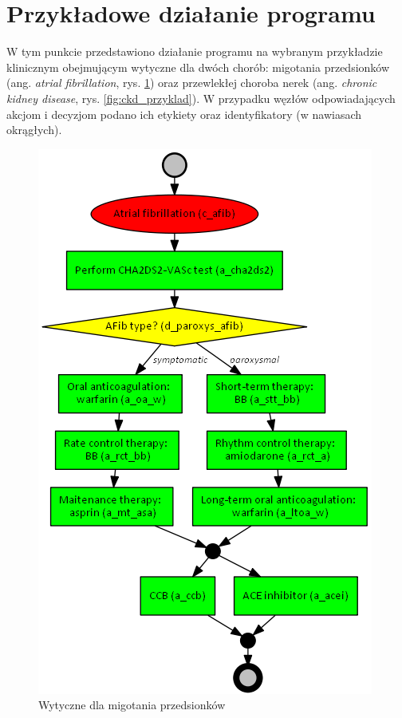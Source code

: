 \section{Przykładowe działanie programu}
W tym punkcie przedstawiono działanie programu na wybranym przykładzie klinicznym obejmującym wytyczne dla dwóch chorób: migotania przedsionków (ang. \textit{atrial fibrillation}, rys. \ref{fig:afib_przyklad}) oraz przewlekłej choroba nerek (ang. \textit{chronic kidney disease}, rys. \ref{fig:ckd_przyklad}). W przypadku węzłów odpowiadających akcjom i decyzjom podano ich etykiety oraz identyfikatory (w nawiasach okrągłych).

\begin{figure}[H]
\centering
\includegraphics[scale=0.5]{img/afib-ver-4_przyklad.png}
\caption{Wytyczne dla migotania przedsionków}
\label{fig:afib_przyklad}
\end{figure}
